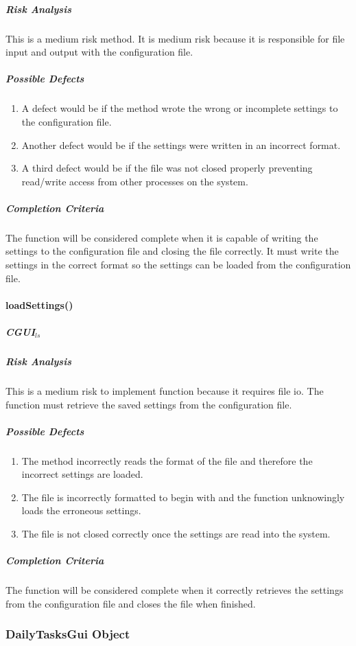 \documentclass{article}
\begin{document}
\subparagraph{Risk Analysis}
This is a medium risk method. It is medium risk because it is responsible for file input and output with the configuration file. 

\subparagraph{Possible Defects}
\begin{enumerate}
\item A defect would be if the method wrote the wrong or incomplete settings to the configuration file.
\item Another defect would be if the settings were written in an incorrect format.
\item A third defect would be if the file was not closed properly preventing read/write access from other processes on the system.
\end{enumerate}

\subparagraph{Completion Criteria}
The function will be considered complete when it is capable of writing the settings to the configuration file and closing the file correctly. It must write the settings in the correct format so the settings can be loaded from the configuration file.

\paragraph{loadSettings()}
\subparagraph{CGUI$_{ls}$}

\subparagraph{Risk Analysis}
This is a medium risk to implement function because it requires file io. The function must retrieve the saved settings from the configuration file.

\subparagraph{Possible Defects}
\begin{enumerate}
\item The method incorrectly reads the format of the file and therefore the incorrect settings are loaded.
\item The file is incorrectly formatted to begin with and the function unknowingly loads the erroneous settings.
\item The file is not closed correctly once the settings are read into the system.
\end{enumerate}

\subparagraph{Completion Criteria}
The function will be considered complete when it correctly retrieves the settings from the configuration file and closes the file when finished.


\subsubsection{DailyTasksGui Object}
\end{document}
